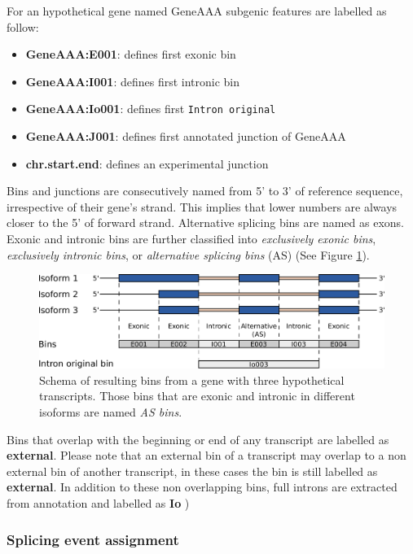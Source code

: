 \documentclass{article}
\begin{document}
For an hypothetical gene named GeneAAA subgenic features are labelled as follow: 
\begin{itemize}
  \item \textbf{GeneAAA:E001}: defines first exonic bin
  \item \textbf{GeneAAA:I001}: defines first intronic bin
  \item \textbf{GeneAAA:Io001}: defines first \texttt{Intron original}
  \item \textbf{GeneAAA:J001}: defines first annotated junction of GeneAAA
  \item \textbf{chr.start.end}: defines an experimental junction
\end{itemize}

Bins and junctions are consecutively named from 5' to 3' of reference sequence, irrespective of their gene's strand. This implies that lower numbers are always closer to the 5' of forward strand. Alternative splicing bins are named as exons.\\


Exonic and intronic bins are further classified into {\em exclusively exonic bins}, {\em exclusively intronic bins}, or {\em alternative splicing bins} (AS) (See Figure \ref{fig:binDefinition}). 

\begin{figure}[ht!]
\centering
\includegraphics[width=12cm]{images/binDefinition.pdf}
\caption{ Schema of resulting bins from a gene with three hypothetical
  transcripts. Those bins that are exonic and intronic in different isoforms are     named \textit{AS bins}.
}
\label{fig:binDefinition}
\end{figure}


Bins that overlap with the beginning or end of any transcript are labelled as \textbf{external}. Please note that an external bin of a transcript may overlap to a non external bin of another transcript, in these cases the bin is still labelled as \textbf{external}. In addition to these non overlapping bins, full introns are extracted from annotation and labelled as \textbf{Io} )

\subsubsection{Splicing event assignment} \label{sec:eventAssign}
\end{document}
